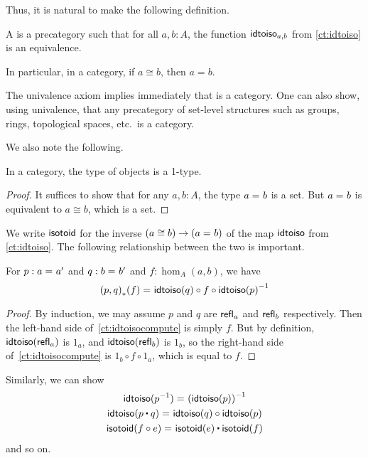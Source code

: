 Thus, it is natural to make the following definition.

\begin{defn}\label{ct:category}
  A  is a precategory such that for all $a,b:A$, the function $\mathsf{idtoiso}_{a,b}$ from \autoref{ct:idtoiso} is an equivalence.
\end{defn}

In particular, in a category, if $a\cong b$, then $a=b$.

\begin{eg}\label{ct:eg:set}
  The univalence axiom implies immediately that \uset is a category.
  One can also show, using univalence, that any precategory of set-level structures such as groups, rings, topological spaces, etc.\ is a category.
\end{eg}

We also note the following.

\begin{lem}\label{ct:obj-1type}
  In a category, the type of objects is a 1-type.
\end{lem}
\begin{proof}
  It suffices to show that for any $a,b:A$, the type $a =_{} b$ is a set.
  But $a =_{} b$ is equivalent to $a \cong b$, which is a set.
\end{proof}

We write $\mathsf{isotoid}$ for the inverse $(a\cong b) \to (a =_{} b)$ of the map $\mathsf{idtoiso}$ from \autoref{ct:idtoiso}.
The following relationship between the two is important.

\begin{lem}\label{ct:idtoiso-trans}
  For $p:a =_{} a'$ and $q:b =_{} b'$ and $f:\hom_A(a,b)$, we have
  \begin{equation}\label{ct:idtoisocompute}
    \id{\trans{(p,q)}{f}}
    {\idtoiso(q)\circ f \circ \inv{\idtoiso(p)}}
  \end{equation}
\end{lem}
\begin{proof}
  By induction, we may assume $p$ and $q$ are $\mathsf{refl}_{a}$ and $\mathsf{refl}_{b}$ respectively.
Then the left-hand side of~\eqref{ct:idtoisocompute} is simply $f$.
  But by definition, $\mathsf{idtoiso}(\mathsf{refl}_{a})$ is $1_a$, and $\mathsf{idtoiso}(\mathsf{refl}_{b})$ is $1_b$, so the right-hand side of~\eqref{ct:idtoisocompute} is $1_b\circ f\circ 1_a$, which is equal to $f$.
\end{proof}

Similarly, we can show
\begin{gather}
  \id{\idtoiso(\rev p)}{\inv {(\idtoiso(p))}}\\
  \id{\idtoiso(p\ct q)}{\idtoiso(q)\circ \idtoiso(p)}\\
  \id{\isotoid(f\circ e)}{\isotoid(e)\ct \isotoid(f)}
\end{gather}
and so on.

